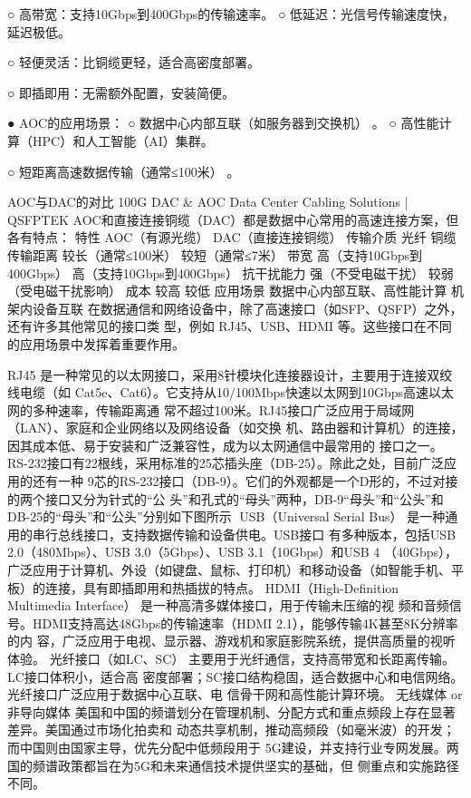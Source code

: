     ○ 高带宽：支持10Gbps到400Gbps的传输速率。
    ○ 低延迟：光信号传输速度快，延迟极低。

    ○ 轻便灵活：比铜缆更轻，适合高密度部署。

    ○ 即插即用：无需额外配置，安装简便。

 ● AOC的应用场景：
    ○ 数据中心内部互联（如服务器到交换机）     。
    ○ 高性能计算（HPC）和人工智能（AI）集群。

    ○ 短距离高速数据传输（通常≤100米）   。

AOC与DAC的对比
100G DAC & AOC Data Center Cabling Solutions | QSFPTEK
AOC和直接连接铜缆（DAC）都是数据中心常用的高速连接方案，但各有特点：
 特性      AOC（有源光缆）           DAC（直接连接铜缆）
 传输介质    光纤                  铜缆
 传输距离    较长（通常≤100米）         较短（通常≤7米）
 带宽      高（支持10Gbps到400Gbps） 高（支持10Gbps到400Gbps）
 抗干扰能力 强（不受电磁干扰）             较弱（受电磁干扰影响）
 成本      较高                  较低
 应用场景    数据中心内部互联、高性能计算 机架内设备互联
在数据通信和网络设备中，除了高速接口（如SFP、QSFP）之外，还有许多其他常见的接口类
型，例如 RJ45、USB、HDMI 等。这些接口在不同的应用场景中发挥着重要作用。

RJ45 是一种常见的以太网接口，采用8针模块化连接器设计，主要用于连接双绞线电缆（如
Cat5e、Cat6）。它支持从10/100Mbps快速以太网到10Gbps高速以太网的多种速率，传输距离通
常不超过100米。RJ45接口广泛应用于局域网（LAN）、家庭和企业网络以及网络设备（如交换
机、路由器和计算机）的连接，因其成本低、易于安装和广泛兼容性，成为以太网通信中最常用的
接口之一。
RS-232接口有22根线，采用标准的25芯插头座（DB-25）。除此之处，目前广泛应用的还有一种
9芯的RS-232接口（DB-9）。它们的外观都是一个D形的，不过对接的两个接口又分为针式的“公
头”和孔式的“母头”两种，DB-9“母头”和“公头”和DB-25的“母头”和“公头”分别如下图所示
USB（Universal Serial Bus） 是一种通用的串行总线接口，支持数据传输和设备供电。USB接口
有多种版本，包括USB 2.0（480Mbps）、USB 3.0（5Gbps）、USB 3.1（10Gbps）和USB 4
（40Gbps），广泛应用于计算机、外设（如键盘、鼠标、打印机）和移动设备（如智能手机、平
板）的连接，具有即插即用和热插拔的特点。
HDMI（High-Definition Multimedia Interface） 是一种高清多媒体接口，用于传输未压缩的视
频和音频信号。HDMI支持高达48Gbps的传输速率（HDMI 2.1），能够传输4K甚至8K分辨率的内
容，广泛应用于电视、显示器、游戏机和家庭影院系统，提供高质量的视听体验。
光纤接口（如LC、SC） 主要用于光纤通信，支持高带宽和长距离传输。LC接口体积小，适合高
密度部署；SC接口结构稳固，适合数据中心和电信网络。光纤接口广泛应用于数据中心互联、电
信骨干网和高性能计算环境。
无线媒体 or 非导向媒体
美国和中国的频谱划分在管理机制、分配方式和重点频段上存在显著差异。美国通过市场化拍卖和
动态共享机制，推动高频段（如毫米波）的开发；而中国则由国家主导，优先分配中低频段用于
5G建设，并支持行业专网发展。两国的频谱政策都旨在为5G和未来通信技术提供坚实的基础，但
侧重点和实施路径不同。




